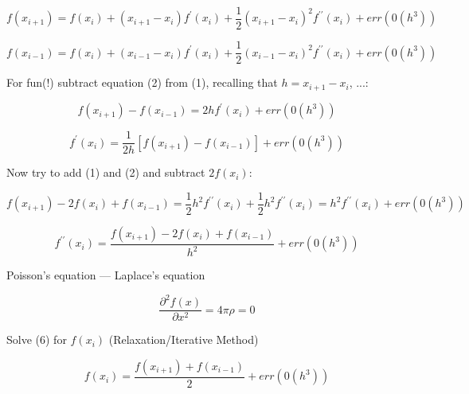 \documentclass[12pt]{article}
\begin{document}
\begin{equation}
 f(x_{i+1}) = f(x_i) + (x_{i+1} - x_i)f^{\prime}(x_i) + \frac{1}{2}(x_{i+1} - x_i)^2 f^{\prime\prime}(x_i) + err(0(h^3))
\end {equation}

\begin{equation}
 f(x_{i-1}) = f(x_i) + (x_{i-1} - x_i) f^{\prime}(x_i) + \frac{1}{2}(x_{i-1} - x_i)^2 f^{\prime\prime}(x_i) + err(0(h^3))
\end {equation}

\noindent For fun(!) subtract equation (2) from (1), recalling that $h = x_{i+1} - x_i$, ...:

\begin{equation}
 f(x_{i+1}) - f(x_{i-1}) = 2hf^{\prime}(x_i) + err(0(h^3))
\end {equation}

\begin{equation}
 f^{\prime}(x_i) = \frac{1}{2h}[f(x_{i+1}) - f(x_{i-1})] + err(0(h^3))
 \end {equation}

\noindent Now try to add (1) and (2) and subtract $2f(x_i)$:

\begin{equation}
 f(x_{i+1}) - 2f(x_i) + f(x_{i-1}) = \frac{1}{2}h^2 f^{\prime\prime}(x_i) + \frac{1}{2}h^2 f^{\prime\prime}(x_i) = h^2 f^{\prime\prime}(x_i) + err(0(h^3))
 \end {equation}
 
 \begin{equation}
  f^{\prime\prime}(x_i) = \frac{f(x_{i+1}) - 2f(x_i) + f(x_{i-1})}{h^2} + err(0(h^3))
 \end {equation}
  
 \noindent Poisson's equation --- Laplace's equation
 
 \begin{equation}
 \frac {\partial^2 f(x)}{\partial x^2} = 4\pi\rho = 0
  \end {equation}
  
 \noindent Solve (6) for $f(x_i)$ (Relaxation/Iterative Method)
 
 \begin{equation}
 f(x_i) = \frac{f(x_{i+1}) + f(x_{i-1})}{2} + err(0(h^3))
  \end {equation}
  
  
\end{document}
